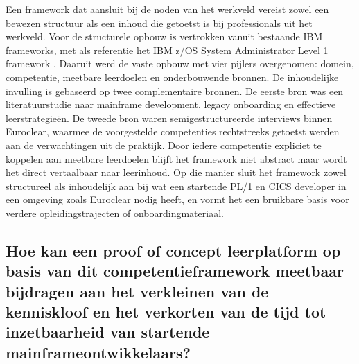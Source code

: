 Een framework dat aansluit bij de noden van het werkveld vereist zowel een bewezen structuur als een inhoud die getoetst is bij professionals uit het werkveld.
Voor de structurele opbouw is vertrokken vanuit bestaande IBM frameworks, met als referentie het IBM z/OS System Administrator Level 1 framework \autocite{ibm_z_sysadmin_level1}.
Daaruit werd de vaste opbouw met vier pijlers overgenomen: domein, competentie, meetbare leerdoelen en onderbouwende bronnen.
De inhoudelijke invulling is gebaseerd op twee complementaire bronnen.
De eerste bron was een literatuurstudie naar mainframe development, legacy onboarding en effectieve leerstrategieën. 
De tweede bron waren semigestructureerde interviews binnen Euroclear, waarmee de voorgestelde competenties rechtstreeks getoetst werden aan de verwachtingen uit de praktijk.
Door iedere competentie expliciet te koppelen aan meetbare leerdoelen blijft het framework niet abstract maar wordt het direct vertaalbaar naar leerinhoud.
Op die manier sluit het framework zowel structureel als inhoudelijk aan bij wat een startende PL/1 en CICS developer in een omgeving zoals Euroclear nodig heeft, en vormt het een bruikbare basis voor verdere opleidingstrajecten of onboardingmateriaal.

\subsection{Hoe kan een proof of concept leerplatform op basis van dit competentieframework meetbaar bijdragen aan het verkleinen van de kenniskloof en het verkorten van de tijd tot inzetbaarheid van startende mainframeontwikkelaars?}%
\label{sec:antwoord-deelvraag-3}

